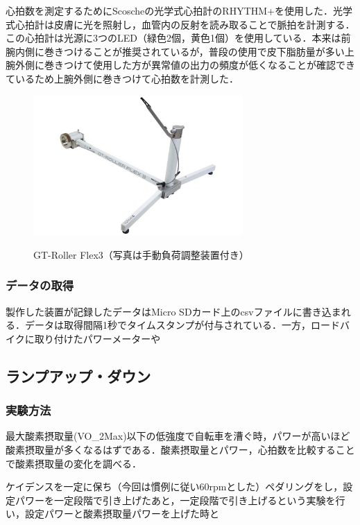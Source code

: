 心拍数を測定するためにScoscheの光学式心拍計のRHYTHM+を使用した．光学式心拍計は皮膚に光を照射し，血管内の反射を読み取ることで脈拍を計測する．この心拍計は光源に3つのLED（緑色2個，黄色1個）を使用している．本来は前腕内側に巻きつけることが推奨されているが，普段の使用で皮下脂肪量が多い上腕外側に巻きつけて使用した方が異常値の出力の頻度が低くなることが確認できているため上腕外側に巻きつけて心拍数を計測した．

\begin{figure}[h]
  \begin{center}
    \label{fig:gt-roller_flex3}
    \includegraphics[width=8cm]{fig/gt-roller_flex3.jpg}
    \caption{GT-Roller Flex3（写真は手動負荷調整装置付き）}
  \end{center}
\end{figure}

\subsubsection{データの取得}

製作した装置が記録したデータはMicro SDカード上のcsvファイルに書き込まれる．データは取得間隔1秒でタイムスタンプが付与されている．一方，ロードバイクに取り付けたパワーメーターや

\subsection{ランプアップ・ダウン}

\subsubsection{実験方法}

最大酸素摂取量(VO_2Max)以下の低強度で自転車を漕ぐ時，パワーが高いほど酸素摂取量が多くなるはずである．酸素摂取量とパワー，心拍数を比較することで酸素摂取量の変化を調べる．

ケイデンスを一定に保ち（今回は慣例に従い60rpmとした）ペダリングをし，設定パワーを一定段階で引き上げたあと，一定段階で引き上げるという実験を行い，設定パワーと酸素摂取量パワーを上げた時と

